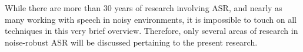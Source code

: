 \documentclass[dissertation,copyright]{uathesis}
\begin{document}

% 

While there are more than 30 years of research involving ASR, and nearly as many working with speech in noisy environments, it is impossible to touch on all techniques in this very brief overview.  Therefore, only several areas of research in noise-robust ASR will be discussed pertaining to the present research.
\end{document}
